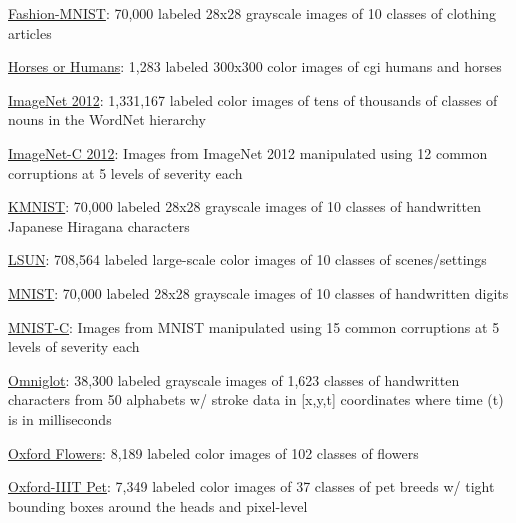 \documentclass{tufte-handout}
\begin{document}
  \href{https://github.com/tensorflow/datasets/blob/master/docs/datasets.md\#fashion_mnist}{Fashion-MNIST}:
  70,000 labeled 28x28 grayscale images of 10 classes of clothing
  articles
\item
  \href{https://github.com/tensorflow/datasets/blob/master/docs/datasets.md\#horses_or_humans}{Horses
  or Humans}: 1,283 labeled 300x300 color images of cgi humans and
  horses
\item
  \href{https://github.com/tensorflow/datasets/blob/master/docs/datasets.md\#imagenet2012}{ImageNet
  2012}: 1,331,167 labeled color images of tens of thousands of classes
  of nouns in the WordNet hierarchy
\item
  \href{https://github.com/tensorflow/datasets/blob/master/docs/datasets.md\#imagenet2012_corrupted}{ImageNet-C
  2012}: Images from ImageNet 2012 manipulated using 12 common
  corruptions at 5 levels of severity each
\item
  \href{https://github.com/tensorflow/datasets/blob/master/docs/datasets.md\#kmnist}{KMNIST}:
  70,000 labeled 28x28 grayscale images of 10 classes of handwritten
  Japanese Hiragana characters
\item
  \href{https://github.com/tensorflow/datasets/blob/master/docs/datasets.md\#lsun}{LSUN}:
  708,564 labeled large-scale color images of 10 classes of
  scenes/settings
\item
  \href{https://github.com/tensorflow/datasets/blob/master/docs/datasets.md\#mnist}{MNIST}:
  70,000 labeled 28x28 grayscale images of 10 classes of handwritten
  digits
\item
  \href{https://github.com/tensorflow/datasets/blob/master/docs/datasets.md\#mnist_corrupted}{MNIST-C}:
  Images from MNIST manipulated using 15 common corruptions at 5 levels
  of severity each
\item
  \href{https://github.com/tensorflow/datasets/blob/master/docs/datasets.md\#omniglot}{Omniglot}:
  38,300 labeled grayscale images of 1,623 classes of handwritten
  characters from 50 alphabets w/ stroke data in {[}x,y,t{]} coordinates
  where time (t) is in milliseconds
\item
  \href{https://github.com/tensorflow/datasets/blob/master/docs/datasets.md\#oxford_flowers102}{Oxford
  Flowers}: 8,189 labeled color images of 102 classes of flowers
\item
  \href{https://github.com/tensorflow/datasets/blob/master/docs/datasets.md\#oxford_iiit_pet}{Oxford-IIIT
  Pet}: 7,349 labeled color images of 37 classes of pet breeds w/ tight
  bounding boxes around the heads and pixel-level
\end{document}
